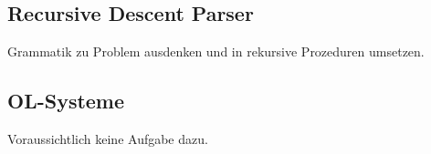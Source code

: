 \subsection{Recursive Descent Parser}
Grammatik zu Problem ausdenken und in rekursive Prozeduren umsetzen.

\subsection{OL-Systeme}
Voraussichtlich keine Aufgabe dazu.

